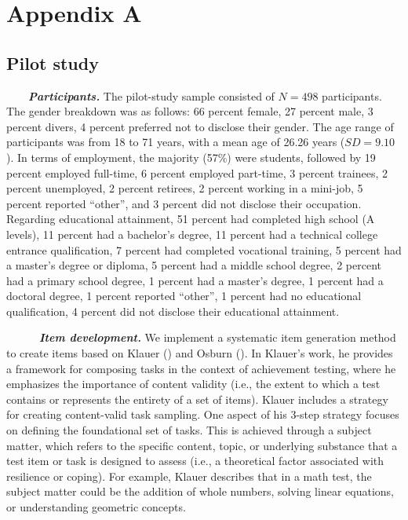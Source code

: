 \documentclass[
  man,floatsintext]{apa7}
\begin{document}
\newpage
\normalsize

\section{Appendix A}\label{appendixa}

\subsection{Pilot study}\label{pilot-study}

~~~~\textbf{\emph{Participants.}} The pilot-study sample consisted of \(N = 498\) participants. The gender breakdown was as follows: 66 percent female, 27 percent male, 3 percent divers, 4 percent preferred not to disclose their gender. The age range of participants was from 18 to 71 years, with a mean age of 26.26 years (\(SD = 9.10\)). In terms of employment, the majority (57\%) were students, followed by 19 percent employed full-time, 6 percent employed part-time, 3 percent trainees, 2 percent unemployed, 2 percent retirees, 2 percent working in a mini-job, 5 percent reported ``other'', and 3 percent did not disclose their occupation. Regarding educational attainment, 51 percent had completed high school (A levels), 11 percent had a bachelor's degree, 11 percent had a technical college entrance qualification, 7 percent had completed vocational training, 5 percent had a master's degree or diploma, 5 percent had a middle school degree, 2 percent had a primary school degree, 1 percent had a master's degree, 1 percent had a doctoral degree, 1 percent reported ``other'', 1 percent had no educational qualification, 4 percent did not disclose their educational attainment.

~~~~~~\textbf{\emph{Item development.}} We implement a systematic item generation method to create items based on Klauer () and Osburn (). In Klauer's work, he provides a framework for composing tasks in the context of achievement testing, where he emphasizes the importance of content validity (i.e., the extent to which a test contains or represents the entirety of a set of items). Klauer includes a strategy for creating content-valid task sampling. One aspect of his 3-step strategy focuses on defining the foundational set of tasks. This is achieved through a subject matter, which refers to the specific content, topic, or underlying substance that a test item or task is designed to assess (i.e., a theoretical factor associated with resilience or coping). For example, Klauer describes that in a math test, the subject matter could be the addition of whole numbers, solving linear equations, or understanding geometric concepts.
\end{document}
